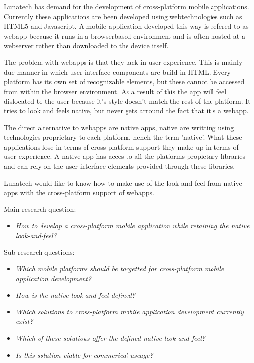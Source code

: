 

Lunatech has demand for the development of cross-platform mobile applications. Currently these applications are been developed using webtechnologies such as HTML5 and Javascript. A mobile application developed this way is refered to as webapp because it runs in a browserbased environment and is often hosted at a webserver rather than downloaded to the device itself.

The problem with webapps is that they lack in user experience. This is mainly due manner in which user interface components are build in HTML. Every platform has its own set of recognizable elements, but these cannot be accessed from within the browser environment. As a result of this the app will feel dislocated to the user because it's style doesn't match the rest of the platform. It tries to look and feels native, but never gets arround the fact that it's a webapp.

The direct alternative to webapps are native apps, native are writting using technologies proprietary to each platform, hench the term 'native'. What these applications lose in terms of cross-platform support they make up in terms of user experience.  A native app has acces to all the platforms propietary libraries and can rely on the user interface elements provided through these libraries.

Lunatech would like to know how to make use of the look-and-feel from native apps with the cross-platform support of webapps.


Main research question:
\begin{itemize}
\item \emph{How to develop a cross-platform mobile application while retaining the native look-and-feel?}
\end{itemize}

\noindent Sub research questions:
\begin{itemize}
\setlength{\itemsep}{0pt}
\item \emph{Which mobile platforms should be targetted for cross-platform mobile application development?}
\item \emph{How is the native look-and-feel defined?}
\item \emph{Which solutions to cross-platform mobile application development currently exist?}
\item \emph{Which of these solutions offer the defined native look-and-feel?}
\item \emph{Is this solution viable for commerical useage?}
\end{itemize}

